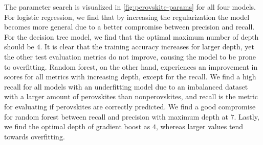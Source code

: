 \begin{table}[!ht]
\centering
\caption{Table with corresponding best estimators during a grid search scheme for predicting perovskites or not. The test score is here referred to as the mean balanced accuracy score of the models with the same parameters in the cross-validation, and we list all standard deviations in paranthesis.}
\label{tab:perovskite-optimal}
\noindent{}
\end{table}

The parameter search is visualized in \autoref{fig:perovskite-params} for all four models. For logistic regression, we find that by increasing the regularization the model becomes more general due to a better compromise between precision and recall. For the decision tree model, we find that the optimal maximum number of depth should be $4$. It is clear that the training accuracy increases for larger depth, yet the other test evaluation metrics do not improve, causing the model to be prone to overfitting. Random forest, on the other hand, experiences an improvement in scores for all metrics with increasing depth, except for the recall. We find a high recall for all models with an underfitting model due to an imbalanced dataset with a larger amount of perovskites than nonperovskites, and recall is the metric for evaluating if perovskites are correctly predicted. We find a good compromise for random forest between recall and precision with maximum depth at $7$. Lastly, we find the optimal depth of gradient boost as $4$, whereas larger values tend towards overfitting.

